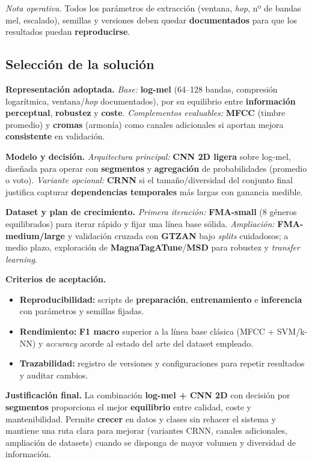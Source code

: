 \documentclass[12pt,twoside]{article}
\begin{document}
\textit{Nota operativa.} Todos los parámetros de extracción (ventana, \textit{hop}, nº de bandas mel, escalado), semillas y versiones deben quedar \textbf{documentados} para que los resultados puedan \textbf{reproducirse}.

\subsection{Selección de la solución}\label{subsec:viabilidad-seleccion}

\textbf{Representación adoptada.} \;
\textit{Base:} \textbf{log-mel} (64--128 bandas, compresión logarítmica, ventana/\textit{hop} documentados), por su equilibrio entre \textbf{información perceptual}, \textbf{robustez} y \textbf{coste}. \;
\textit{Complementos evaluables:} \textbf{MFCC} (timbre promedio) y \textbf{cromas} (armonía) como canales adicionales si aportan mejora \textbf{consistente} en validación.

\textbf{Modelo y decisión.} \;
\textit{Arquitectura principal:} \textbf{CNN 2D ligera} sobre log-mel, diseñada para operar con \textbf{segmentos} y \textbf{agregación} de probabilidades (promedio o voto). \;
\textit{Variante opcional:} \textbf{CRNN} si el tamaño/diversidad del conjunto final justifica capturar \textbf{dependencias temporales} más largas con ganancia medible.

\textbf{Dataset y plan de crecimiento.} \;
\textit{Primera iteración:} \textbf{FMA-small} (8 géneros equilibrados) para iterar rápido y fijar una línea base sólida. \;
\textit{Ampliación:} \textbf{FMA-medium/large} y validación cruzada con \textbf{GTZAN} bajo \textit{splits} cuidadosos; a medio plazo, exploración de \textbf{MagnaTagATune}/\textbf{MSD} para robustez y \textit{transfer learning}.

\textbf{Criterios de aceptación.}
\begin{itemize}
  \item \textbf{Reproducibilidad:} scripts de \textbf{preparación}, \textbf{entrenamiento} e \textbf{inferencia} con parámetros y semillas fijadas.
  \item \textbf{Rendimiento:} \textbf{F1 macro} superior a la línea base clásica (MFCC + SVM/k-NN) y \textit{accuracy} acorde al estado del arte del dataset empleado.
  \item \textbf{Trazabilidad:} registro de versiones y configuraciones para repetir resultados y auditar cambios.
\end{itemize}

\textbf{Justificación final.} La combinación \textbf{log-mel + CNN 2D} con decisión por \textbf{segmentos} proporciona el mejor \textbf{equilibrio} entre calidad, coste y mantenibilidad. Permite \textbf{crecer} en datos y clases sin rehacer el sistema y mantiene una ruta clara para mejorar (variantes CRNN, canales adicionales, ampliación de datasets) cuando se disponga de mayor volumen y diversidad de información.
\end{document}
